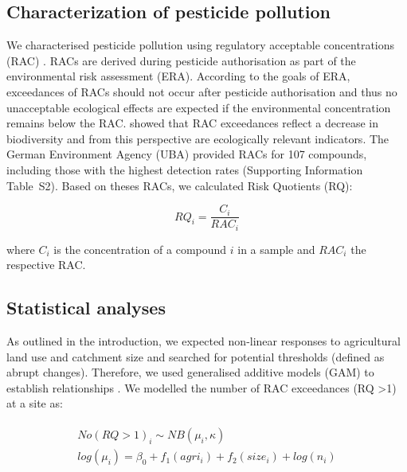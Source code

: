 \documentclass[journal=esthag,manuscript=article]{achemso}
\begin{document}
\subsection{Characterization of pesticide pollution}
We characterised pesticide pollution using regulatory acceptable concentrations (RAC) \citep{brock_linking_2010}.
RACs are derived during pesticide authorisation as part of the environmental risk assessment (ERA).
According to the goals of ERA, exceedances of RACs should not occur after pesticide authorisation \citep{stehle_pesticide_2015} and thus no unacceptable ecological effects are expected if the environmental concentration remains below the RAC. 
\citet{stehle_pesticide_2015} showed that RAC exceedances reflect a decrease in biodiversity and from this perspective are ecologically relevant indicators. 
The German Environment Agency (UBA) provided RACs for 107 compounds, including those with the highest detection rates (Supporting Information Table~S2). 
Based on theses RACs, we calculated Risk Quotients (RQ):

\begin{equation}
RQ_i = \frac{C_i}{RAC_i}
\end{equation}

where $C_i$ is the concentration of a compound $i$ in a sample and $RAC_i$ the respective RAC.


\subsection{Statistical analyses}
As outlined in the introduction, we expected non-linear responses to agricultural land use and catchment size and searched for potential thresholds (defined as abrupt changes).
Therefore, we used generalised additive models (GAM) to establish relationships \citep{fewster_analysis_2000}.
We modelled the number of RAC exceedances (RQ \textgreater 1) at a site as:

\begin{align}
\begin{split}
  No(RQ > 1)_i \sim NB(\mu_i, \kappa) \\
  log(\mu_i)= \beta_0 + f_1(agri_i) + f_2(size_i) + log(n_i) \\
\end{split}
\end{align}
\end{document}
